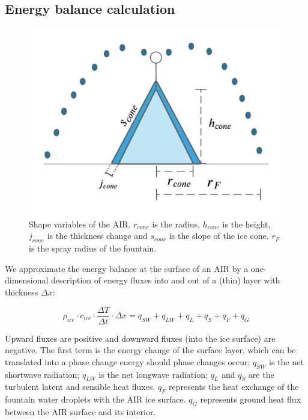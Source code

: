 \documentclass[utf8]{frontiersSCNS}
\begin{document}
\subsection{Energy balance calculation} \label{sec:energy}

\begin{figure}
	\begin{center}
		\includegraphics[width=10 cm]{Figures/Figure_4.jpeg}
	\end{center}
	\caption{Shape variables of the AIR. $r_{cone}$ is the radius, $h_{cone}$ is the height, $j_{cone}$ is the
		thickness change and $s_{cone}$ is the slope of the ice cone. $r_F$ is the spray radius of the fountain.}
	\label{fig:shape}
\end{figure}

We approximate the energy balance at the surface of an AIR by a one-dimensional description of energy fluxes
into and out of a (thin) layer with thickness $\Delta x$:

\begin{equation}
	\rho_{ice} \cdot c_{ice} \cdot \frac{\Delta T}{\Delta t} \cdot \Delta x = q_{SW} + q_{LW} + q_{L} + q_{S} + q_{F} + q_{G}
	\label{eqn:EB}
\end{equation}

Upward fluxes are positive and downward fluxes (into the ice surface) are negative. The first term is the energy change of the surface
layer, which can be translated into a phase change energy should phase changes occur; $q_{SW}$ is the net
shortwave radiation; $q_{LW}$ is the net longwave radiation; $q_{L}$ and $q_{S}$ are the turbulent latent and
sensible heat fluxes. $q_{F}$ represents the heat exchange of the fountain water droplets with the AIR ice
surface. $q_{G}$ represents ground heat flux between the AIR surface and its interior.
\end{document}
